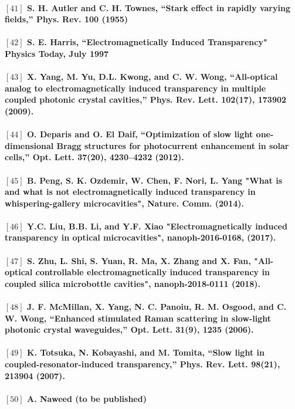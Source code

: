 \paragraph{\normalfont \large $[41]$ S. H. Autler and C. H. Townes, “Stark effect in rapidly varying fields,” Phys. Rev. \textbf{100} (1955) \\ 
\\$[42]$ S. E. Harris, “Electromagnetically Induced Transparency" Physics Today, July 1997 \\
\\$[43]$ X. Yang, M. Yu, D.L. Kwong, and C. W. Wong, “All-optical analog to electromagnetically induced
transparency in multiple coupled photonic crystal cavities,” Phys. Rev. Lett. \textbf{102}(17), 173902 (2009). \\
\\$[44]$  O. Deparis and O. El Daif, “Optimization of slow light one-dimensional Bragg structures for photocurrent
enhancement in solar cells,” Opt. Lett. \textbf{37}(20), 4230–4232 (2012).\\
\\ $[45]$ B. Peng, S. K. Ozdemir, W. Chen, F. Nori, L. Yang "What is and what is not electromagnetically induced transparency in whispering-gallery microcavities", Nature. Comm. (2014).\\
\\ $[46]$ Y.C. Liu, B.B. Li, and Y.F. Xiao "Electromagnetically induced transparency in optical microcavities", nanoph-2016-0168, (2017).\\
\\ $[47]$ S. Zhu, L. Shi, S. Yuan, R. Ma, X. Zhang and X. Fan, "All-optical controllable electromagnetically induced transparency in coupled silica microbottle cavities", nanoph-2018-0111 (2018).\\
\\ $[48]$ J. F. McMillan, X. Yang, N. C. Panoiu, R. M. Osgood, and C. W. Wong, “Enhanced stimulated Raman scattering
in slow-light photonic crystal waveguides,” Opt. Lett. \textbf{31}(9), 1235 (2006).\\
\\ $[49]$ K. Totsuka, N. Kobayashi, and M. Tomita, “Slow light in coupled-resonator-induced transparency,” Phys. Rev.
Lett. \textbf{98}(21), 213904 (2007).\\
\\ $[50]$ A. Naweed (to be published)}

